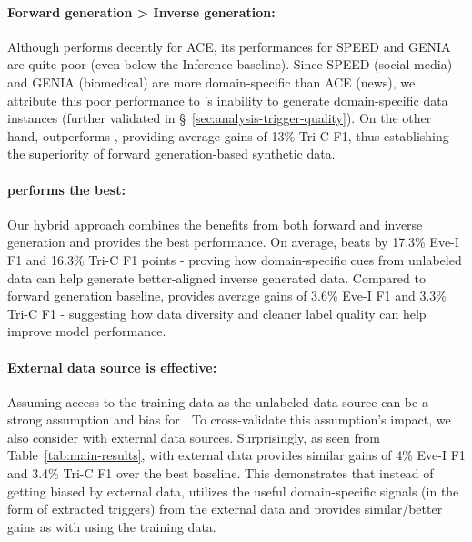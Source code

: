 \paragraph{Forward generation > Inverse generation:}
Although \starName{} performs decently for ACE, its performances for SPEED and GENIA are quite poor (even below the Inference baseline).
Since SPEED (social media) and GENIA (biomedical) are more domain-specific than ACE (news), we attribute this poor performance to \starName's inability to generate domain-specific data instances (further validated in \S~\ref{sec:analysis-trigger-quality}).
On the other hand, \extracttrain{} outperforms \starName{}, providing average gains of 13\% Tri-C F1, thus establishing the superiority of forward generation-based synthetic data.

\paragraph{\modelName{} performs the best:}
Our hybrid approach combines the benefits from both forward and inverse generation and provides the best performance.
On average, \modelName{} beats \starName{} by 17.3\% Eve-I F1 and 16.3\% Tri-C F1 points - proving how domain-specific cues from unlabeled data can help generate better-aligned inverse generated data.
Compared to forward generation \extracttrain{} baseline, \modelName{} provides average gains of 3.6\% Eve-I F1 and 3.3\% Tri-C F1 - suggesting how data diversity and cleaner label quality can help improve model performance.

\paragraph{External data source is effective:}
Assuming access to the training data as the unlabeled data source can be a strong assumption and bias for \modelName.
To cross-validate this assumption's impact, we also consider \modelName{} with external data sources.
Surprisingly, as seen from Table~\ref{tab:main-results}, \modelName{} with external data provides similar gains of 4\% Eve-I F1 and 3.4\% Tri-C F1 over the best baseline.
This demonstrates that instead of getting biased by external data, \modelName{} utilizes the useful domain-specific signals (in the form of extracted triggers) from the external data and provides similar/better gains as with using the training data.

